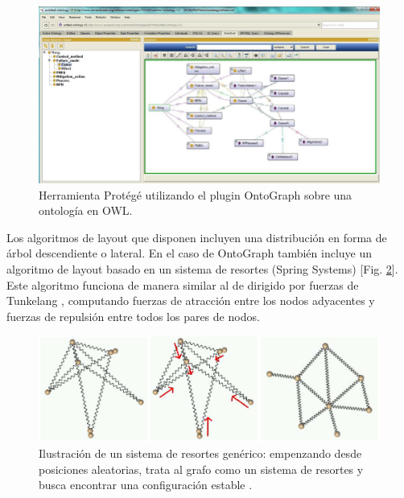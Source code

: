 \begin{figure}[h]
	\centering
	\includegraphics[width=13cm]{imagenes/ontograph.png}
	\caption{Herramienta Protégé utilizando el plugin OntoGraph sobre una ontología en OWL.}
	\label{fig:ontograph}
\end{figure}

Los algoritmos de layout que disponen incluyen una distribución en forma de árbol descendiente o lateral. En el caso de OntoGraph también incluye un algoritmo de layout basado en un sistema de resortes (Spring Systems) \cite{kobourov2012spring}[Fig. \ref{fig:spring_systems}]. Este algoritmo funciona de manera similar al de dirigido por fuerzas de Tunkelang \cite{tunkelang1998jiggle}, computando fuerzas de atracción entre los nodos adyacentes y fuerzas de repulsión entre todos los pares de nodos.

\begin{figure}[H]
	\centering
	\includegraphics[width=13cm]{imagenes/spring_systems.png}
	\caption{Ilustración de un sistema de resortes genérico: empenzando desde posiciones aleatorias, trata al grafo como un sistema de resortes y busca encontrar una configuración estable \cite{gajer2002grip}.}
	\label{fig:spring_systems}
\end{figure}

